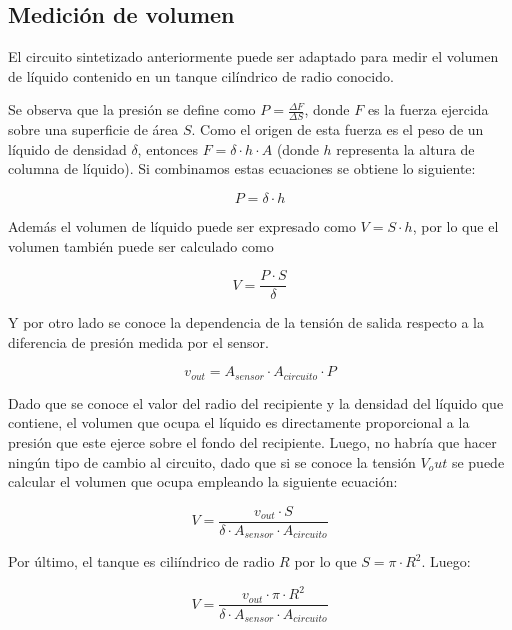 \subsection{Medici\'on de volumen}

El circuito sintetizado anteriormente puede ser adaptado para medir el volumen de l\'iquido contenido en un tanque cil\'indrico de radio conocido.

Se observa que la presi\'on se define como $P = \frac{\Delta F}{\Delta S}$, donde $F$ es la fuerza ejercida sobre una superficie de \'area $S$. Como el origen de esta fuerza es el peso de un l\'iquido de densidad $\delta$, entonces $F = \delta \cdot h \cdot A$ (donde $h$ representa la altura de columna de l\'iquido). Si combinamos estas ecuaciones se obtiene lo siguiente:

\begin{equation}
P  = \delta \cdot h
\end{equation}

Adem\'as el volumen de l\'iquido puede ser expresado como $V = S \cdot h$, por lo que el volumen tambi\'en puede ser calculado como

\begin{equation}
V = \frac{P \cdot S}{\delta}
\end{equation}

Y por otro lado se conoce la dependencia de la tensi\'on de salida respecto a la diferencia de presi\'on medida por el sensor.

\begin{equation}
v_{out} = A_{sensor} \cdot A_{circuito} \cdot P
\end{equation}

Dado que se conoce el valor del radio del recipiente y la densidad del l\'iquido que contiene, el volumen que ocupa el l\'iquido es directamente proporcional a la presi\'on que este ejerce sobre el fondo del recipiente. Luego, no habr\'ia que hacer ning\'un tipo de cambio al circuito, dado que si se conoce la tensi\'on $V_out$ se puede calcular el volumen que ocupa empleando la siguiente ecuaci\'on:

\begin{equation}
V = \frac{v_{out} \cdot S}{\delta \cdot A_{sensor} \cdot A_{circuito}}
\end{equation}

Por \'ultimo, el tanque es cili\'indrico de radio $R$ por lo que $S = \pi \cdot R^2$. Luego:

\begin{equation}
V = \frac{v_{out} \cdot \pi \cdot R^2}{\delta \cdot A_{sensor} \cdot A_{circuito}}
\end{equation}


